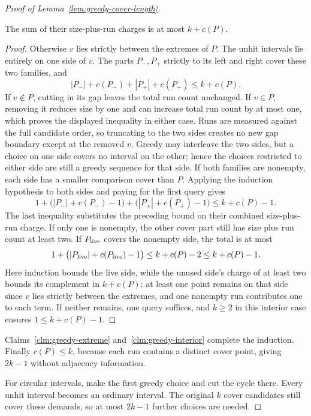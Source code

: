 \begin{proof}[Proof of Lemma~\ref{lem:greedy-cover-length}]
\begin{claim}
\label{clm:greedy-interior}
The sum of their size-plus-run charges is at most $k+c(P)$.
\end{claim}
\begin{proof}
Otherwise $v$ lies strictly between the extremes of $P$.
The unhit intervals lie entirely on one side of $v$.
The parts $P_-,P_+$ strictly to its left and right cover these
two families, and
\[
 |P_-|+c(P_-)+|P_+|+c(P_+)\le k+c(P).
\]
If $v\notin P$, cutting in its gap leaves the total run count
unchanged. If $v\in P$, removing it reduces size by one and can
increase total run count by at most one, which proves the displayed
inequality in either case. Runs are measured against the full candidate
order, so truncating to the two sides creates no new gap boundary except
at the removed $v$. Greedy may interleave the two sides, but
a choice on one side covers no interval on the other; hence the
choices restricted to either side are still a greedy sequence for
that side. If both families are nonempty, each side has a smaller
comparison cover than $P$. Applying the induction hypothesis to
both sides and paying for the first query gives
\[
 1+\bigl(|P_-|+c(P_-)-1\bigr)
   +\bigl(|P_+|+c(P_+)-1\bigr)\le k+c(P)-1.
\]
The last inequality substitutes the preceding bound on their
combined size-plus-run charge.
If only one is nonempty, the other cover part still has size plus
run count at least two. If $P_{\rm live}$ covers the nonempty side,
the total is at most
\[
 1+\bigl(|P_{\rm live}|+c(P_{\rm live})-1\bigr)
 \le k+c(P)-2\le k+c(P)-1.
\]
Here induction bounds the live side, while the unused side's
charge of at least two bounds its complement in $k+c(P)$: at least one
point remains on that side since $v$ lies strictly between the extremes,
and one nonempty run contributes one to each term.
If neither remains, one query suffices, and $k\ge2$ in this interior
case ensures $1\le k+c(P)-1$.
\end{proof}
Claims~\ref{clm:greedy-extreme} and~\ref{clm:greedy-interior}
complete the induction. Finally $c(P)\le k$, because each run
contains a distinct cover point, giving $2k-1$ without adjacency
information.

For circular intervals, make the first greedy choice and cut the
cycle there. Every unhit interval becomes an ordinary interval.
The original $k$ cover candidates still cover these demands,
so at most $2k-1$ further choices are needed.
\end{proof}

